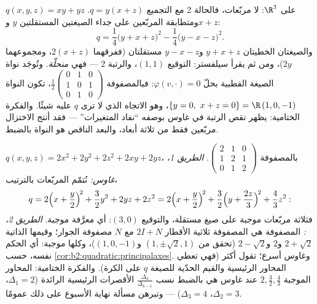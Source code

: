 \begin{example}\label{ex:b2:quadratic:degenerate}
$q(x, y, z) = xy + yz$ على $\R^3$: لا مربّعات، فالحالة 2 مع
التجميع $q = y(x + z)$. ومتطابقة المربّعين على جداء
الصيغتين المستقلتين $y$ و$x + z$:
\[
q = \frac14\bigl(y + x + z\bigr)^2 -
\frac14\bigl(y - x - z\bigr)^2 .
\]
والصيغتان الخطيتان $y + x + z$ و$y - x - z$
مستقلتان (ففرقهما $2(x+z)$، ومجموعهما $2y$)، ومن ثم
يقرأ سيلفستر: التوقيع $(1, 1)$، والرتبة $2$ ---
فهي \emph{منحلّة}. وتُوجَد نواة الصيغة القطبية
بحلّ $\varphi(v, \cdot) = 0$: فبالمصفوفة
$\frac12\begin{pmatrix} 0&1&0\\ 1&0&1\\ 0&1&0\end{pmatrix}$،
تكون النواة $\{y = 0,\ x + z = 0\} = \R\,(1, 0, -1)$، وهو
الاتجاه الذي لا ترى $q$ عليه شيئًا. والفكرة الختامية: يظهر
نقص الرتبة في غاوس بوصفه ``نفاد المتغيرات''
--- فقد أنتج الاختزال مربّعين فقط من ثلاثة
أبعاد، والبعد الناقص هو النواة بالضبط.
\end{example}

\begin{example}\label{ex:b2:quadratic:tworoads}
$q(x, y, z) = 2x^2 + 2y^2 + 2z^2 + 2xy + 2yz$، بالمصفوفة
$\begin{pmatrix} 2 & 1 & 0\\ 1 & 2 & 1\\ 0 & 1 & 2
\end{pmatrix}$. \emph{الطريق 1، غاوس:} نُتمّم المربّعات
بالترتيب،
\[
q = 2\Bigl(x + \frac y2\Bigr)^{\!2} + \frac32 y^2 + 2yz + 2z^2
= 2\Bigl(x + \frac y2\Bigr)^{\!2}
+ \frac32\Bigl(y + \frac{2z}{3}\Bigr)^{\!2} + \frac43 z^2 :
\]
فثلاثة مربّعات موجبة على صيغ مستقلة، والتوقيع $(3,
0)$: أي معرَّفة موجبة. \emph{الطريق 2، :} المصفوفة
هي المصفوفة ثلاثية الأقطار $2I + N$ مع $N$ مصفوفة الجوار؛ وقيمها
الذاتية $2 + \sqrt2$ و$2$ و$2 - \sqrt2$ (تحقق من
 $(1, \pm\sqrt2, 1)$ و$(1, 0, -1)$)، وكلها
موجبة: أي الحكم نفسه، حسب
\cref{cor:b2:quadratic:principalaxes}. وغاوس أسرع؛
 تقول أكثر (فهي تعطي المحاور الرئيسية والقيم
الحدّية للصيغة $q$ على الكرة). والفكرة الختامية: المحاور
الموجبة $2, \frac32, \frac43$ عند غاوس هي بالضبط
نسب $\frac{\Delta_k}{\Delta_{k-1}}$ الأقصرات الرئيسية
الرائدة ($\Delta_1 = 2$، $\Delta_2 = 3$، $\Delta_3 = 4$) --- وتبرهن
مسألة نهاية الأسبوع على ذلك عمومًا.
\end{example}

